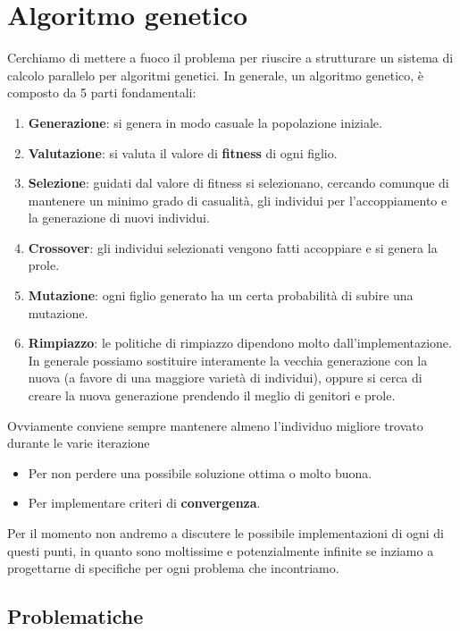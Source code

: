 \section{Algoritmo genetico}

Cerchiamo di mettere a fuoco il problema per riuscire a strutturare un sistema
di calcolo parallelo per algoritmi genetici. In generale, un algoritmo genetico,
è composto da 5 parti fondamentali:
\begin{enumerate}
	\item \textbf{Generazione}: si genera in modo casuale la popolazione
	      iniziale.
	\item \textbf{Valutazione}: si valuta il valore di \textbf{fitness} di ogni
	      figlio.
	\item \textbf{Selezione}: guidati dal valore di fitness si selezionano,
	      cercando comunque di mantenere un minimo grado di casualità, gli
	      individui per l'accoppiamento e la generazione di nuovi individui.
	\item \textbf{Crossover}: gli individui selezionati vengono fatti
	      accoppiare e si genera la prole.
	\item \textbf{Mutazione}: ogni figlio generato ha un certa probabilità di
	      subire una mutazione.
	\item \textbf{Rimpiazzo}: le politiche di rimpiazzo dipendono molto
	      dall'implementazione. In generale possiamo sostituire interamente la
	      vecchia generazione con la nuova (a favore di una maggiore varietà di
	      individui), oppure si cerca di creare la nuova generazione prendendo
	      il meglio di genitori e prole.
\end{enumerate}
Ovviamente conviene sempre mantenere almeno l'individuo migliore trovato
durante le varie iterazione
\begin{itemize}
	\item Per non perdere una possibile soluzione ottima o molto buona.
	\item Per implementare criteri di \textbf{convergenza}.
\end{itemize}
Per il momento non andremo a discutere le possibile implementazioni di ogni di
questi punti, in quanto sono moltissime e potenzialmente infinite se inziamo a
progettarne di specifiche per ogni problema che incontriamo.

\subsection{Problematiche}

